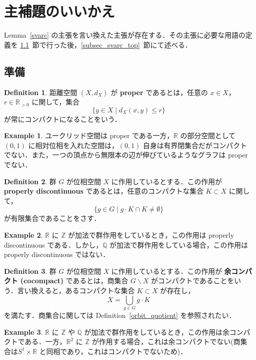 \documentclass[dvipdfmx]{ujarticle}
\theoremstyle{definition}
\newtheorem{dfn}{Definition}[section]
\newtheorem*{ex*}{Example}
\begin{document}
\section{主補題のいいかえ} \label{sec_ouyou}
Lemma~\ref{svarc} の主張を言い換えた主張が存在する．その主張に必要な用語の定義を \ref{subsec_jyunbi}~節で行った後，\ref{subsec_svarc_top}~節にて述べる．
\subsection{準備}\label{subsec_jyunbi}
\begin{dfn}
  距離空間 $(X,d_X)$ が \textbf{proper} であるとは，任意の $x\in X$，$r\in \mathbb{R}_{>0}$ に関して，集合
  $$\{y\in X\mid d_X(x,y)\leq r\}$$
  が常にコンパクトになることをいう．
\end{dfn}

\begin{ex*}
  ユークリッド空間は proper である一方，$\mathbb{R}$ の部分空間として $(0,1)$ に相対位相を入れた空間は，$(0,1)$ 自身は有界閉集合だがコンパクトでない．また，一つの頂点から無限本の辺が伸びているようなグラフは proper でない．
\end{ex*}

\begin{dfn}
 群 $G$ が位相空間 $X$ に作用しているとする．この作用が \textbf{properly discontinuous} であるとは，任意のコンパクトな集合 $K\subset X$ に関して，
 $$\{g\in G\mid g\cdot K\cap K\neq \emptyset\}$$
 が有限集合であることをさす．
\end{dfn}

\begin{ex*}
$\mathbb{R}$ に $\mathbb{Z}$ が加法で群作用をしているとき，この作用は properly discontinuous である．しかし，$\mathbb{Q}$ が加法で群作用をしている場合，この作用は properly discontinuous ではない．
\end{ex*}

\begin{dfn}
  群 $G$ が位相空間 $X$ に作用しているとする．この作用が \textbf{余コンパクト (cocompact)} であるとは，商集合 $G\backslash X$ がコンパクトであることをいう．言い換えると，あるコンパクトな集合 $K\subset X$ が存在し，
  $$X=\bigcup_{g\in G}g\cdot K$$
  を満たす．商集合に関しては Definition~\ref{orbit_quotient} を参照されたい．
\end{dfn}

\begin{ex*}
  $\mathbb{R}$ に $\mathbb{Z}$ や $\mathbb{Q}$ が加法で群作用をしているとき，この作用は余コンパクトである．一方，$\mathbb{R}^2$ に $\mathbb{Z}$ が作用する場合，これは余コンパクトでない(商集合は$S^1\times \mathbb{R}$ と同相であり，これはコンパクトでないため)．
\end{ex*}
\end{document}
